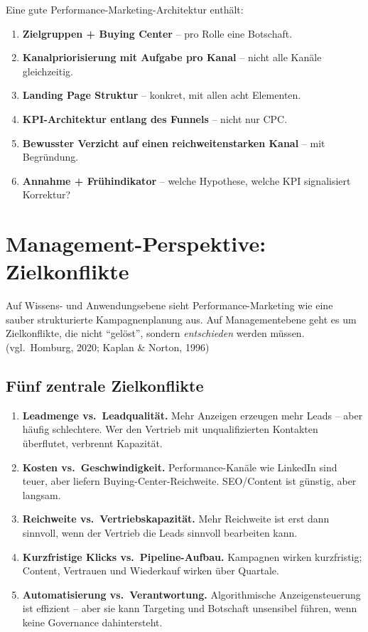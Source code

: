 \documentclass[11pt,a4paper,oneside]{article}
\newcommand{\quelle}[1]{{\footnotesize\color{lpGray}(#1)}}
\begin{document}
\begin{merkbox}
Eine gute Performance-Marketing-Architektur enthält:
\begin{enumerate}
  \item \textbf{Zielgruppen + Buying Center} -- pro Rolle eine Botschaft.
  \item \textbf{Kanalpriorisierung mit Aufgabe pro Kanal} -- nicht alle Kanäle gleichzeitig.
  \item \textbf{Landing Page Struktur} -- konkret, mit allen acht Elementen.
  \item \textbf{KPI-Architektur entlang des Funnels} -- nicht nur CPC.
  \item \textbf{Bewusster Verzicht auf einen reichweitenstarken Kanal} -- mit Begründung.
  \item \textbf{Annahme + Frühindikator} -- welche Hypothese, welche KPI signalisiert Korrektur?
\end{enumerate}
\end{merkbox}

\section{Management-Perspektive: Zielkonflikte}

Auf Wissens- und Anwendungsebene sieht Performance-Marketing wie eine sauber strukturierte Kampagnenplanung aus. Auf Managementebene geht es um Zielkonflikte, die nicht ``gelöst'', sondern \emph{entschieden} werden müssen. \quelle{vgl.\ Homburg, 2020; Kaplan \& Norton, 1996}

\subsection{Fünf zentrale Zielkonflikte}

\begin{enumerate}
  \item \textbf{Leadmenge vs.\ Leadqualität.} Mehr Anzeigen erzeugen mehr Leads -- aber häufig schlechtere. Wer den Vertrieb mit unqualifizierten Kontakten überflutet, verbrennt Kapazität.
  \item \textbf{Kosten vs.\ Geschwindigkeit.} Performance-Kanäle wie LinkedIn sind teuer, aber liefern Buying-Center-Reichweite. SEO/Content ist günstig, aber langsam.
  \item \textbf{Reichweite vs.\ Vertriebskapazität.} Mehr Reichweite ist erst dann sinnvoll, wenn der Vertrieb die Leads sinnvoll bearbeiten kann.
  \item \textbf{Kurzfristige Klicks vs.\ Pipeline-Aufbau.} Kampagnen wirken kurzfristig; Content, Vertrauen und Wiederkauf wirken über Quartale.
  \item \textbf{Automatisierung vs.\ Verantwortung.} Algorithmische Anzeigensteuerung ist effizient -- aber sie kann Targeting und Botschaft unsensibel führen, wenn keine Governance dahintersteht.
\end{enumerate}
\end{document}
